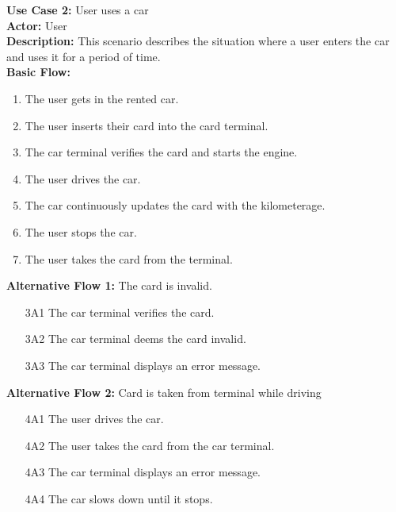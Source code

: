 \documentclass[a4paper]{article}
\begin{document}
\noindent \textbf{Use Case 2:} User uses a car\\
\textbf{Actor:} User\\
\textbf{Description:} This scenario describes the situation where a user enters the car and uses it for a period of time.\\
\textbf{Basic Flow:}
\begin{enumerate}
    \item The user gets in the rented car.
    \item The user inserts their card into the card terminal.
    \item The car terminal verifies the card and starts the engine.
    \item The user drives the car.
    \item The car continuously updates the card with the kilometerage.
    \item The user stops the car.
    \item The user takes the card from the terminal.
\end{enumerate}
\textbf{Alternative Flow 1:} The card is invalid.
\begin{enumerate}
    \item[3A1] The car terminal verifies the card.
    \item[3A2] The car terminal deems the card invalid.
    \item[3A3] The car terminal displays an error message. 
\end{enumerate}
\textbf{Alternative Flow 2:} Card is taken from terminal while driving
\begin{enumerate}
    \item[4A1] The user drives the car.
    \item[4A2] The user takes the card from the car terminal.
    \item[4A3] The car terminal displays an error message.
    \item[4A4] The car slows down until it stops. %
\end{enumerate}
\end{document}

